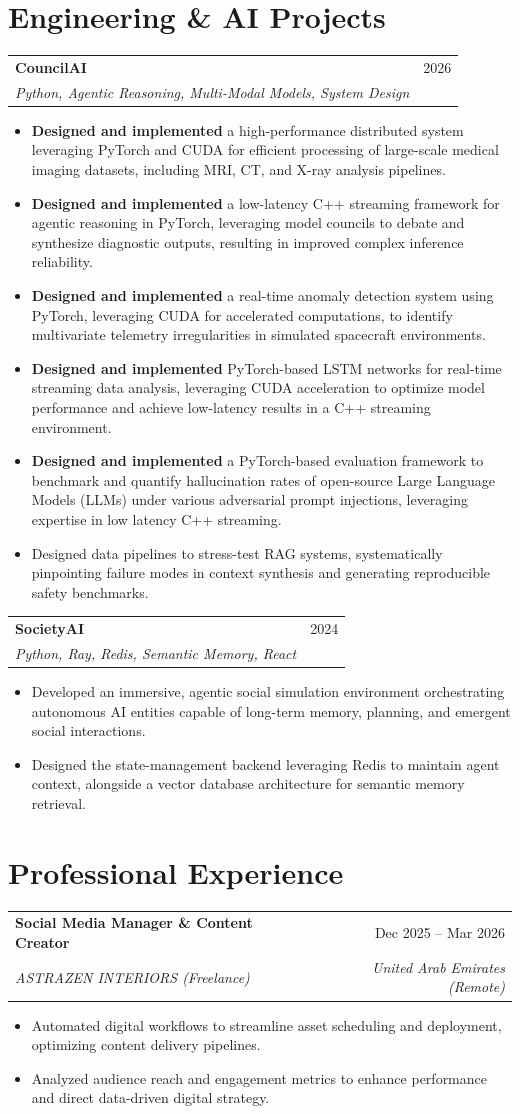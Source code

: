 \documentclass[letterpaper,10pt]{article}
\makeatletter
\newcommand{\resumeSubheading}[4]{
  \vspace{2pt}\noindent
    \begin{tabular*}{0.97\textwidth}[t]{l@{\extracolsep{\fill}}r}
      \textbf{#1} & #2 \\
      \textit{\small#3} & \textit{\small #4} \\
    \end{tabular*}\vspace{-5pt}
}
\newcommand{\resumeItemListStart}{\begin{itemize}[leftmargin=0.15in, label={--}]}
\newcommand{\resumeItemListEnd}{\end{itemize}\vspace{-5pt}}
\newcommand{\resumeItem}[1]{\item\small{#1 \vspace{-2pt}}}
\makeatother
\begin{document}
\section*{Engineering \& AI Projects}
\resumeSubheading
  {CouncilAI}{2026}
  {Python, Agentic Reasoning, Multi-Modal Models, System Design}{}
\resumeItemListStart
  \resumeItem{\textbf{Designed and implemented} a high-performance distributed system leveraging PyTorch and CUDA for efficient processing of large-scale medical imaging datasets, including MRI, CT, and X-ray analysis pipelines.}
  \resumeItem{\textbf{Designed and implemented} a low-latency C++ streaming framework for agentic reasoning in PyTorch, leveraging model councils to debate and synthesize diagnostic outputs, resulting in improved complex inference reliability.}
  \resumeItem{\textbf{Designed and implemented} a real-time anomaly detection system using PyTorch, leveraging CUDA for accelerated computations, to identify multivariate telemetry irregularities in simulated spacecraft environments.}
  \resumeItem{\textbf{Designed and implemented} PyTorch-based LSTM networks for real-time streaming data analysis, leveraging CUDA acceleration to optimize model performance and achieve low-latency results in a C++ streaming environment.}
  \resumeItem{\textbf{Designed and implemented} a PyTorch-based evaluation framework to benchmark and quantify hallucination rates of open-source Large Language Models (LLMs) under various adversarial prompt injections, leveraging expertise in low latency C++ streaming.}
  \resumeItem{Designed data pipelines to stress-test RAG systems, systematically pinpointing failure modes in context synthesis and generating reproducible safety benchmarks.}
\resumeItemListEnd

\resumeSubheading
  {SocietyAI}{2024}
  {Python, Ray, Redis, Semantic Memory, React}{}
\resumeItemListStart
  \resumeItem{Developed an immersive, agentic social simulation environment orchestrating autonomous AI entities capable of long-term memory, planning, and emergent social interactions.}
  \resumeItem{Designed the state-management backend leveraging Redis to maintain agent context, alongside a vector database architecture for semantic memory retrieval.}
\resumeItemListEnd

\section*{Professional Experience}
\resumeSubheading
  {Social Media Manager \& Content Creator}{Dec 2025 -- Mar 2026}
  {ASTRAZEN INTERIORS (Freelance)}{United Arab Emirates (Remote)}
\resumeItemListStart
  \resumeItem{Automated digital workflows to streamline asset scheduling and deployment, optimizing content delivery pipelines.}
  \resumeItem{Analyzed audience reach and engagement metrics to enhance performance and direct data-driven digital strategy.}
\resumeItemListEnd
\end{document}

